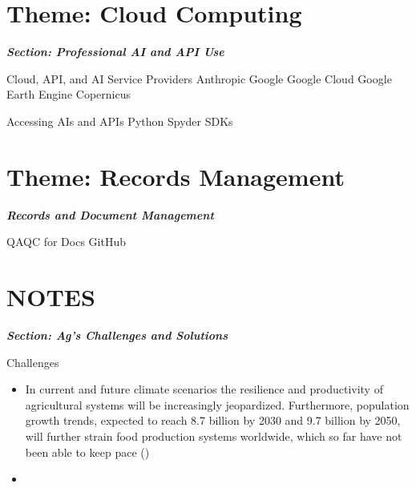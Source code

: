 \documentclass[12pt, letterpaper]{article}
\begin{document}
\section{Theme: Cloud Computing}

\large
\begin{flushleft}
\textbf{\textit{Section: Professional AI and API  Use}}
\end{flushleft}
\normalsize

\begin{outline}[enumerate]
\1 Cloud, API, and AI Service Providers
\2 Anthropic
\2 Google
\3 Google Cloud
\3 Google Earth Engine
\2 Copernicus

\1 Accessing AIs and APIs
\2 Python
\2 Spyder
\2 SDKs
\end{outline}


\section{Theme: Records Management}
\large
\begin{flushleft}
\textbf{\textit{Records and Document Management}}
\end{flushleft}
\normalsize

\begin{outline}[enumerate]
\1 QAQC for Docs
\1 GitHub

\end{outline}

\pagebreak

\thispagestyle{plain} 

\section{NOTES}

\large
\begin{flushleft}
\textbf{\textit{Section: Ag's Challenges and Solutions}}
\end{flushleft}
\normalsize
Challenges
\begin{itemize}
  \item In current and future climate scenarios the resilience and productivity of agricultural systems will be increasingly jeopardized. Furthermore, population growth trends, expected to reach 8.7 billion by 2030 and 9.7 billion by 2050, will further strain food production systems worldwide, which so far have not been able to keep pace (\textbf{\cite{segarra_remote_2020}})
  \item 
\end{itemize}
\end{document}

